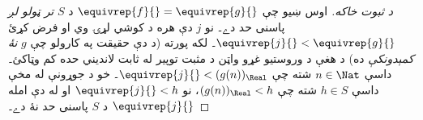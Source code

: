 \documentclass[../../../include/open-logic-section]{subfiles}
\begin{document}
\begin{proof}[د ثبوت خاکه]
اوس ښيو چې $\equivrep{f}{} = \equivrep{g}{}$ د $S$ \emph{تر ټولو
لږ} پاسنی حد دے۔ نو $j$ دې هره د کوشي لړۍ وي او فرض کړئ
$\equivrep{j}{} < \equivrep{g}{}$۔ لکه پورته (د دې حقيقت په کارولو
چې $g$ \emph{نۀ کمېدونکې} ده) د هغې د وروستيو غړو
واټن د مثبت توپير له ثابت لانديني حده کم وټاکئ۔ داسې $n \in \Nat$
شته چې $\equivrep{j}{} < (g(n))_\Real$۔ خو د جوړونې له مخې
داسې $h \in S$ شته چې $(g(n))_\Real < h$، نو
$\equivrep{j}{} < h$ او له دې امله
$\equivrep{j}{}$ د $S$ پاسنی حد نۀ دے۔
\end{proof}
\end{document}
